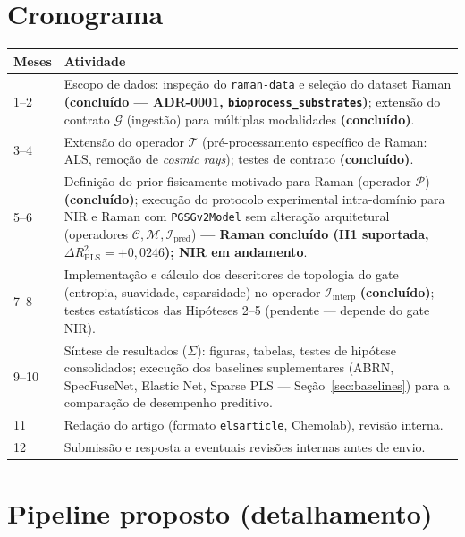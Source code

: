 \documentclass[11pt,a4paper]{article}
\begin{document}
\section{Cronograma}

\begin{center}
\begin{tabular}{p{1.6cm}p{11.5cm}}
\toprule
Meses & Atividade \\
\midrule
1--2 & Escopo de dados: inspeção do \texttt{raman-data} e seleção do dataset Raman \textbf{(concluído --- ADR-0001, \texttt{bioprocess\_substrates})}; extensão do contrato $\mathcal{G}$ (ingestão) para múltiplas modalidades \textbf{(concluído)}. \\
3--4 & Extensão do operador $\mathcal{T}$ (pré-processamento específico de Raman: ALS, remoção de \emph{cosmic rays}); testes de contrato \textbf{(concluído)}. \\
5--6 & Definição do prior fisicamente motivado para Raman (operador $\mathcal{P}$) \textbf{(concluído)}; execução do protocolo experimental intra-domínio para NIR e Raman com \texttt{PGSGv2Model} sem alteração arquitetural (operadores $\mathcal{C}, \mathcal{M}, \mathcal{I}_{\text{pred}}$) \textbf{--- Raman concluído (H1 suportada, $\Delta R^2_{\text{PLS}}=+0{,}0246$); NIR em andamento}. \\
7--8 & Implementação e cálculo dos descritores de topologia do gate (entropia, suavidade, esparsidade) no operador $\mathcal{I}_{\text{interp}}$ \textbf{(concluído)}; testes estatísticos das Hipóteses 2--5 (pendente --- depende do gate NIR). \\
9--10 & Síntese de resultados ($\Sigma$): figuras, tabelas, testes de hipótese consolidados; execução dos baselines suplementares (ABRN, SpecFuseNet, Elastic Net, Sparse PLS --- Seção~\ref{sec:baselines}) para a comparação de desempenho preditivo. \\
11 & Redação do artigo (formato \texttt{elsarticle}, Chemolab), revisão interna. \\
12 & Submissão e resposta a eventuais revisões internas antes de envio. \\
\bottomrule
\end{tabular}
\end{center}

\appendix

\section{Pipeline proposto (detalhamento)}
\end{document}
